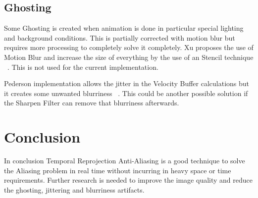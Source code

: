 \documentclass{acmsiggraph}               %
\begin{document}
\subsection{Ghosting}
Some Ghosting is created when animation is done in particular special lighting and background conditions. This is partially corrected with motion blur but requires more processing to completely solve it completely. Xu proposes the use of Motion Blur and increase the size of everything by the use of an Stencil technique ~\cite{XU2016}. This is not used for the current implementation. 

Pederson implementation allows the jitter in the Velocity Buffer calculations but it creates some unwanted blurriness ~\cite{Fuglsand2016}. This could be another possible solution if the Sharpen Filter can remove that blurriness afterwards.

\section{Conclusion}
In conclusion Temporal Reprojection Anti-Aliasing is a good technique to solve the Aliasing problem in real time without incurring in heavy space or time requirements. Further research is needed to improve the image quality and reduce the ghosting, jittering and blurriness artifacts. 



\end{document}
